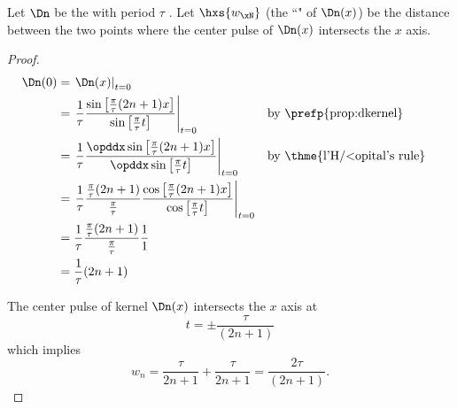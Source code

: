 \begin{proposition}
\label{prop:Dn_0}
Let $\Dn$ be the  with period $\tau$ .
Let $\hxs{w_\xN}$ (the ``" of $\Dn(x)$) be the 
distance between the two points where the center pulse of $\Dn(x)$ intersects the $x$ axis.
\end{proposition}
\begin{proof}
\begin{align*}
   \Dn(0)
       &= \left. \Dn(x) \right|_{t=0}
     \\&= \left. \frac{1}{\tau}
          \frac{\sin\left[ \frac{\pi}{\tau}(2n+1)x  \right] }
          {\sin\left[ \frac{\pi}{\tau}t        \right] }
          \right|_{t=0}
       && \text{by \prefp{prop:dkernel}}
     \\&= \left. \frac{1}{\tau}
          \frac{\opddx\sin\left[ \frac{\pi}{\tau}(2n+1)x  \right] }
               {\opddx\sin\left[ \frac{\pi}{\tau}t        \right] }
          \right|_{t=0}
       && \text{by \thme{l'H{/<o}pital's rule}}
     \\&= \left. \frac{1}{\tau}
          \frac{\frac{\pi}{\tau}(2n+1)}{\frac{\pi}{\tau}}
          \frac{\cos\left[ \frac{\pi}{\tau}(2n+1)x  \right] }
               {\cos\left[ \frac{\pi}{\tau}t        \right] }
          \right|_{t=0}
     \\&= \frac{1}{\tau}
          \frac{\frac{\pi}{\tau}(2n+1)}{\frac{\pi}{\tau}}
          \frac{1 }{1 }
     \\&= \frac{1}{\tau}(2n+1)
\end{align*}

The center pulse of kernel $\Dn(x)$ intersects the $x$ axis
at
\[ t = \pm \frac{\tau}{(2n+1)}\]
which implies
\[ w_n = \frac{\tau}{2n+1}+\frac{\tau}{2n+1} = \frac{2\tau}{(2n+1)}.\]
\end{proof}

